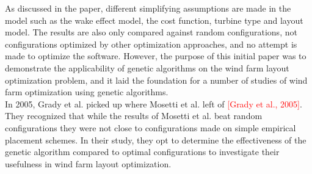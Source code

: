 \begin{center}
\begin{table}[h!]
\caption{Optimized configurations compared against random configurations for each of the three scenarios (a) single wind direction, (b) multiple wind direction with constant intensity and (c) multiple wind direction and intensity {\citep{Mosetti}}.}
\label{Results Mosetti et al.}
\end{table}
\end{center}


As discussed in the paper, different simplifying assumptions are made in the model such as the wake effect model, the cost function, turbine type and layout model. The results are also only compared against random configurations, not configurations optimized by other optimization approaches, and no attempt is made to optimize the software. However, the purpose of this initial paper was to demonstrate the applicability of genetic algorithms on the wind farm layout optimization problem, and it laid the foundation for a number of studies of wind farm optimization using genetic algorithms. \\


\noindent In 2005, Grady et al. picked up where Mosetti et al. left of \textcolor{red}{[Grady et al., 2005]}. They recognized that while the results of Mosetti et al. beat random configurations they were not close to configurations made on simple empirical placement schemes. In their study, they opt to determine the effectiveness of the genetic algorithm compared to optimal configurations to investigate their usefulness in wind farm layout optimization. \\

